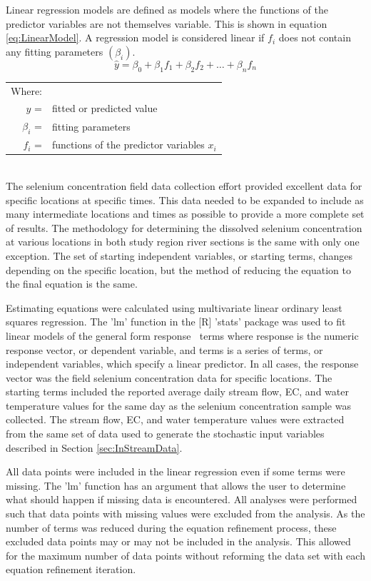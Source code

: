 \begin{linenumbers}
Linear regression models are defined as models where the functions of the predictor variables are not themselves variable.  This is shown in equation \ref{eq:LinearModel}.  A regression model is considered linear if $f_i$ does not contain any fitting parameters $(\beta_i)$.
\begin{equation}
\label{eq:LinearModel}
\hat{y}=\beta_0+\beta_1 f_1+\beta_2 f_2+\ldots+\beta_n f_n
\end{equation}
\begin{tabular}{r l}
Where:&\\
$\hat{y}$ = & fitted or predicted value\\
$\beta_i$ = & fitting parameters\\
$f_i$ = & functions of the predictor variables $x_i$\\
\end{tabular}\\

The selenium concentration field data collection effort provided excellent data for specific locations at specific times.  This data needed to be expanded to include as many intermediate locations and times as possible to provide a more complete set of results.  The methodology for determining the dissolved selenium concentration at various locations in both study region river sections is the same with only one exception.  The set of starting independent variables, or starting terms, changes depending on the specific location, but the method of reducing the equation to the final equation is the same.

Estimating equations were calculated using multivariate linear ordinary least squares regression.  The 'lm' function in the [R] 'stats' package was used to fit linear models of the general form response $~$ terms where response is the numeric response vector, or dependent variable, and terms is a series of terms, or independent variables, which specify a linear predictor.  In all cases, the response vector was the field selenium concentration data for specific locations.  The starting terms included the reported average daily stream flow, EC, and water temperature values for the same day as the selenium concentration sample was collected.  The stream flow, EC, and water temperature values were extracted from the same set of data used to generate the stochastic input variables described in Section \ref{sec:InStreamData}.  

All data points were included in the linear regression even if some terms were missing.  The 'lm' function has an argument that allows the user to determine what should happen if missing data is encountered.  All analyses were performed such that data points with missing values were excluded from the analysis.  As the number of terms was reduced during the equation refinement process, these excluded data points may or may not be included in the analysis.  This allowed for the maximum number of data points without reforming the data set with each equation refinement iteration.


\end{linenumbers}
